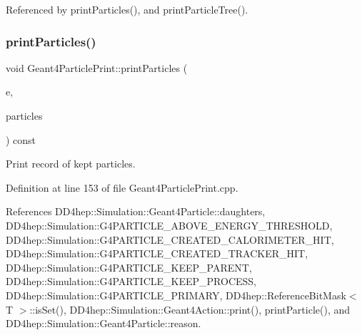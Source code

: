 Referenced by print\+Particles(), and print\+Particle\+Tree().

\hypertarget{class_d_d4hep_1_1_simulation_1_1_geant4_particle_print_ab1cca2970424ee0ae8107e0ff49cd2d8}{}\label{class_d_d4hep_1_1_simulation_1_1_geant4_particle_print_ab1cca2970424ee0ae8107e0ff49cd2d8} 
\subsubsection{\texorpdfstring{print\+Particles()}{printParticles()}}
{\footnotesize\ttfamily void Geant4\+Particle\+Print\+::print\+Particles (\begin{DoxyParamCaption}\item[{const G4\+Event $\ast$}]{e,  }\item[{const \hyperlink{class_d_d4hep_1_1_simulation_1_1_geant4_particle_print_a1c6a9ccb9393484ee16c7cd344e20f4a}{Particle\+Map} \&}]{particles }\end{DoxyParamCaption}) const\hspace{0.3cm}{\ttfamily [protected]}}



Print record of kept particles. 



Definition at line 153 of file Geant4\+Particle\+Print.\+cpp.



References D\+D4hep\+::\+Simulation\+::\+Geant4\+Particle\+::daughters, D\+D4hep\+::\+Simulation\+::\+G4\+P\+A\+R\+T\+I\+C\+L\+E\+\_\+\+A\+B\+O\+V\+E\+\_\+\+E\+N\+E\+R\+G\+Y\+\_\+\+T\+H\+R\+E\+S\+H\+O\+LD, D\+D4hep\+::\+Simulation\+::\+G4\+P\+A\+R\+T\+I\+C\+L\+E\+\_\+\+C\+R\+E\+A\+T\+E\+D\+\_\+\+C\+A\+L\+O\+R\+I\+M\+E\+T\+E\+R\+\_\+\+H\+IT, D\+D4hep\+::\+Simulation\+::\+G4\+P\+A\+R\+T\+I\+C\+L\+E\+\_\+\+C\+R\+E\+A\+T\+E\+D\+\_\+\+T\+R\+A\+C\+K\+E\+R\+\_\+\+H\+IT, D\+D4hep\+::\+Simulation\+::\+G4\+P\+A\+R\+T\+I\+C\+L\+E\+\_\+\+K\+E\+E\+P\+\_\+\+P\+A\+R\+E\+NT, D\+D4hep\+::\+Simulation\+::\+G4\+P\+A\+R\+T\+I\+C\+L\+E\+\_\+\+K\+E\+E\+P\+\_\+\+P\+R\+O\+C\+E\+SS, D\+D4hep\+::\+Simulation\+::\+G4\+P\+A\+R\+T\+I\+C\+L\+E\+\_\+\+P\+R\+I\+M\+A\+RY, D\+D4hep\+::\+Reference\+Bit\+Mask$<$ T $>$\+::is\+Set(), D\+D4hep\+::\+Simulation\+::\+Geant4\+Action\+::print(), print\+Particle(), and D\+D4hep\+::\+Simulation\+::\+Geant4\+Particle\+::reason.



